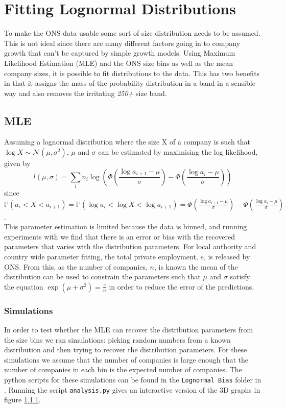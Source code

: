 \documentclass[a4paper,10pt]{article}
\begin{document}
   \section{Fitting Lognormal Distributions}
   To make the ONS data usable some sort of size distribution needs to be assumed. This is not ideal since there are many different factors going in to company growth that can't be captured by simple growth models. Using Maximum Likelihood Estimation (MLE) and the ONS size bins as well as the mean company sizes, it is possible to fit distributions to the data. This has two benefits in that it assigns the mass of the probability distribution in a band in a sensible way and also removes the irritating \emph{250+} size band.
   
   \subsection{MLE}
  
   Assuming a lognormal distribution where the size X of a company is such that $\log X \sim \mathcal{N}(\mu, \sigma^2)$, $\mu$ and $\sigma$ can be estimated by maximising the log likelihood, given by
   \begin{equation}
   l(\mu, \sigma) = \sum_i n_i \log \left( \Phi \left( \frac{\log a_{i + 1} - \mu}{\sigma} \right) - \Phi \left( \frac{\log a_{i} - \mu}{\sigma} \right) \right)
   \end{equation}
   since $\mathbb{P}(a_i < X < a_{i + 1}) = \mathbb{P}(\log a_i < \log X < \log a_{i + 1}) = \Phi \left( \frac{\log a_{i + 1} - \mu}{\sigma} \right) - \Phi \left( \frac{\log a_{i} - \mu}{\sigma} \right)$. \\
   This parameter estimation is limited because the data is binned, and running experiments with we find that there is an error or bias with the recovered parameters that varies with the distribution parameters. For local authority and country wide parameter fitting, the total private employment, $e$, is released by ONS. From this, as the number of companies, $n$, is known the mean of the distribution can be used to constrain the parameters such that $\mu$ and $\sigma$ satisfy the equation $\exp(\mu + \sigma^2) = \frac{e}{n}$ in order to reduce the error of the predictions.

   \subsubsection{Simulations}

   In order to test whether the MLE can recover the distribution parameters from the size bins we ran simulations: picking random numbers from a known distribution and then trying to recover the distribution parameters. For these simulations we assume that the number of companies is large enough that the number of companies in each bin is the expected number of companies. The python scripts for these simulations can be found in the \texttt{Lognormal Bias} folder in \cite{github}. Running the script \texttt{analysis.py} gives an interactive version of the 3D graphs in figure \ref{}.
\end{document}

